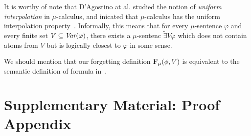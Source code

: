 \documentclass[runningheads]{llncs}
\begin{document}
It is worthy of note that D'Agostino at al. studied the notion of \emph{uniform interpolation} in $\mu$-calculus, and inicated that $\mu$-calculus has the uniform interpolation property~\cite{d1996uniform,d2006modal}. Informally, this means that for every $\mu$-sentence $\varphi$ and every finite set $V\subseteq \textit{Var}(\varphi)$, there exists a $\mu$-sentenc $\widetilde{\exists}V \varphi$ which does not contain atoms from $V$ but is logically closest to $\varphi$ in some sense.

We should mention that our forgetting definition ${\textsc{F}_{\textsc{$\mu$}}}(\phi, V)$ is equivalent to the semantic definition of formula in~\cite{d2006modal}.

\clearpage








\clearpage
\appendix
\section{Supplementary Material: Proof Appendix}
\end{document}

